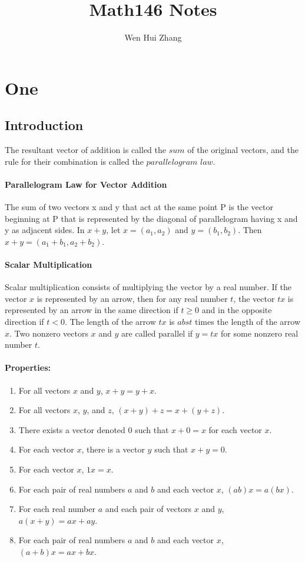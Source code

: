 \documentclass[11pt]{article}
\title{Math146 Notes}
\author{Wen Hui Zhang}
\begin{document}
\section{One}
\subsection{Introduction}
The resultant vector of addition is called the $sum$ of the original vectors, and the rule for their
combination is called the $parallelogram$ $law$.
\paragraph{Parallelogram Law for Vector Addition}
The sum of two vectors x and y that act at the same point P is the vector beginning at P that is represented by the diagonal
of parallelogram having x and y as adjacent sides.
In $x + y$, let $x = (a_1, a_2)$ and $y = (b_1, b_2)$. Then $x + y = (a_1 + b_1, a_2 + b_2)$.

\paragraph{Scalar Multiplication}
Scalar multiplication consists of multiplying the vector by a real number. If the vector $x$ is represented by an arrow, then for any real number $t$, the vector $tx$ is represented by an arrow in the same direction if $t \geq 0$ and in the opposite direction if $t < 0$. The length of the arrow $tx$ is $abs{t}$ times the length of the arrow $x$.
Two nonzero vectors $x$ and $y$ are called parallel if $y = tx$ for some nonzero real number $t$.

\paragraph{Properties:}
\begin{enumerate}
	\item For all vectors $x$ and $y$, $x + y = y + x$.
	\item For all vectors $x$, $y$, and $z$, $(x + y) + z = x + (y + z)$.
	\item There exists a vector denoted $0$ such that $x + 0 = x$ for each vector $x$.
	\item For each vector $x$, there is a vector $y$ such that $x + y = 0$.
	\item For each vector $x$, $1x = x$.
	\item For each pair of real numbers $a$ and $b$ and each vector $x$, $(ab)x = a(bx)$.
	\item For each real number $a$ and each pair of vectors $x$ and $y$, $a(x + y) = ax + ay$.
	\item For each pair of real numbers $a$ and $b$ and each vector $x$, $(a + b)x = ax + bx$.
\end{enumerate}
\end{document}
